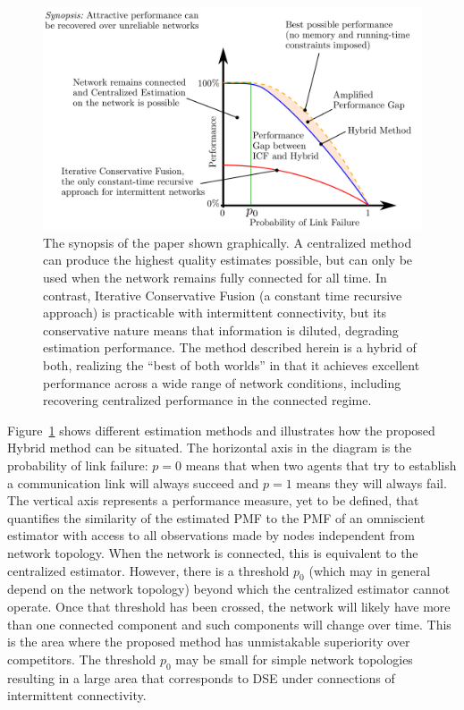 \documentclass[journal]{IEEEtran}
\theoremstyle{remark}
\theoremstyle{definition}
\begin{document}
\begin{figure}[t]
\centering
\includegraphics[width=1.0\columnwidth]{./synopsis_for_journal_inkscape_text_black.pdf}
\caption{The synopsis of the paper shown graphically. A centralized method can produce
the highest quality estimates possible, but can only be used when the network
remains fully connected for all time. 
In contrast, Iterative Conservative Fusion (a constant time recursive
approach) is practicable with intermittent connectivity, but its 
conservative nature means that information is diluted, degrading estimation
performance. The method described herein is a hybrid of both, realizing the
``best of both worlds'' in that it achieves excellent performance across a wide range
of network conditions, including recovering centralized performance in the
connected regime.
\label{fig:synopsis} }
\end{figure} 



Figure~\ref{fig:synopsis} shows different estimation methods and illustrates
how the proposed Hybrid method can be situated.  The horizontal axis in the
diagram is the probability of link failure: $p=0$ means that when two agents
that try to establish a communication link will always succeed and $p=1$ means
they will always fail. The vertical axis represents a performance measure, yet
to be defined, that quantifies the similarity of the estimated PMF to the PMF
of an omniscient estimator with access to all observations made by nodes independent from
network topology.  When the network is connected, this is equivalent to the
centralized estimator.  However, there is a threshold $p_0$ (which may in general
depend on the network topology) beyond which the centralized estimator cannot
operate.  Once that threshold has been crossed, the network will likely have
more than one connected component and such components will change over time.
This is the area where the proposed method has unmistakable superiority over
competitors. The threshold $p_0$ may be small for simple network topologies
resulting in a large area that corresponds to DSE under connections of
intermittent connectivity.
\end{document}
